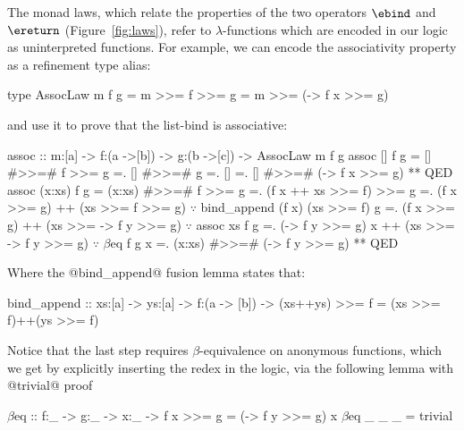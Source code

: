 
%
The monad laws, which relate the
properties of the two operators
$\ebind$ and $\ereturn$ (Figure~\ref{fig:laws}),
refer to $\lambda$-functions which
are encoded in our logic as uninterpreted functions.
%
For example, we can encode the associativity property
as a refinement type alias:
%
\begin{code}
  type AssocLaw m f g = { m >>= f >>= g = m >>= (\x -> f x >>= g) }
\end{code}
%
and use it to prove that the list-bind is associative:
%
\begin{mcode}
  assoc :: m:[a] -> f:(a ->[b]) -> g:(b ->[c]) -> AssocLaw m f g
  assoc [] f g     =  [] #>>=# f >>= g
                   =. [] #>>=# g
                   =. []
                   =. [] #>>=# (\x -> f x >>= g) ** QED
  assoc (x:xs) f g =  (x:xs) #>>=# f  >>= g
                   =. (f x ++ xs >>= f) >>= g
                   =. (f x >>= g) ++ (xs >>= f >>= g) $\because$ bind_append (f x) (xs >>= f) g
                   =. (f x >>= g) ++ (xs >>= \y -> f y >>= g) $\because$ assoc xs f g
                   =. (\y -> f y >>= g) x ++ (xs >>= \y -> f y >>= g) $\because$ $\beta$eq f g x
                   =. (x:xs) #>>=# (\y -> f y >>= g) ** QED
\end{mcode}
%
Where the @bind_append@ fusion lemma states that:
%
\begin{code}
bind_append
  :: xs:[a] -> ys:[a] -> f:(a -> [b]) -> {(xs++ys) >>= f = (xs >>= f)++(ys >>= f)}
\end{code}
%
Notice that the last step requires
$\beta$-equivalence on anonymous
functions, which we get by explicitly
inserting the redex in the logic,
via the following lemma with @trivial@ proof
%
\begin{mcode}
    $\beta$eq :: f:_ -> g:_ -> x:_ -> {f x >>= g = (\y -> f y >>= g) x}
    $\beta$eq _ _ _ = trivial
\end{mcode}

